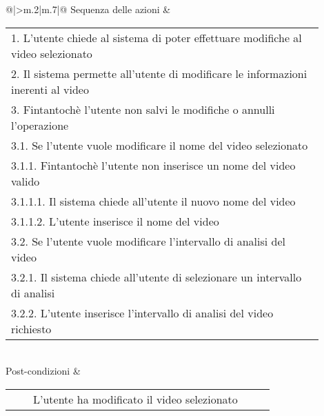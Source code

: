 \begin{longtable}{@{}|>{\centering\arraybackslash}m{.2\textwidth}|m{.7\textwidth}|@{}}
		Sequenza delle azioni & \begin{tabular}{m{0.9\linewidth}}\hspace{0.0cm}1. L'utente chiede al sistema di poter effettuare modifiche al video selezionato\\\hspace{0.0cm}2. Il sistema permette all'utente di modificare le informazioni inerenti al video\\\hspace{0.0cm}3. Fintantochè l'utente non salvi le modifiche o annulli l'operazione\\\hspace{0.5cm}\hspace{0.0cm}3.1. Se l'utente vuole modificare il nome del video selezionato\\\hspace{1.0cm}\hspace{0.5cm}\hspace{0.0cm}3.1.1. Fintantochè l'utente non inserisce un nome del video valido\\\hspace{1.5cm}\hspace{1.0cm}\hspace{0.5cm}\hspace{0.0cm}3.1.1.1. Il sistema chiede all'utente il nuovo nome del video\\\hspace{1.5cm}\hspace{1.0cm}\hspace{0.5cm}\hspace{0.0cm}3.1.1.2. L'utente inserisce il nome del video\\\hspace{0.5cm}\hspace{0.0cm}3.2. Se l'utente vuole modificare l'intervallo di analisi del video\\\hspace{1.0cm}\hspace{0.5cm}\hspace{0.0cm}3.2.1. Il sistema chiede all'utente di selezionare un intervallo di analisi\\\hspace{1.0cm}\hspace{0.5cm}\hspace{0.0cm}3.2.2. L'utente inserisce l'intervallo di analisi del video richiesto\\\end{tabular}\\
		Post-condizioni & \begin{tabular}{m{0.9\linewidth}}~~\llap{\textbullet}~~L'utente ha modificato il video selezionato\\\end{tabular}\\

\end{longtable}
